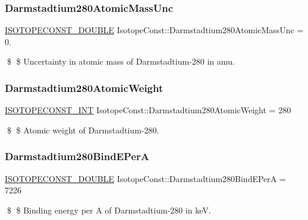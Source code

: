 \subsubsection{\texorpdfstring{Darmstadtium280\+Atomic\+Mass\+Unc}{Darmstadtium280AtomicMassUnc}}
{\footnotesize\ttfamily \mbox{\hyperlink{group___isotope_const-_macros_ga8f45a7272ce02c0b4c65c44636ed719a}{I\+S\+O\+T\+O\+P\+E\+C\+O\+N\+S\+T\+\_\+\+D\+O\+U\+B\+LE}} Isotope\+Const\+::\+Darmstadtium280\+Atomic\+Mass\+Unc = 0.}

\$ \$ Uncertainty in atomic mass of Darmstadtium-\/280 in amu. \mbox{\label{group___isotope_const-_darmstadtium-_ds280_ga6f14062b07b43977050a2e5d0925e7a1}} 
\subsubsection{\texorpdfstring{Darmstadtium280\+Atomic\+Weight}{Darmstadtium280AtomicWeight}}
{\footnotesize\ttfamily \mbox{\hyperlink{group___isotope_const-_macros_ga5f18360b3e99483a35c32d789e62621c}{I\+S\+O\+T\+O\+P\+E\+C\+O\+N\+S\+T\+\_\+\+I\+NT}} Isotope\+Const\+::\+Darmstadtium280\+Atomic\+Weight = 280}

\$ \$ Atomic weight of Darmstadtium-\/280. \mbox{\label{group___isotope_const-_darmstadtium-_ds280_ga363094922e09783d7a60f2b14e49276d}} 
\subsubsection{\texorpdfstring{Darmstadtium280\+Bind\+E\+PerA}{Darmstadtium280BindEPerA}}
{\footnotesize\ttfamily \mbox{\hyperlink{group___isotope_const-_macros_ga8f45a7272ce02c0b4c65c44636ed719a}{I\+S\+O\+T\+O\+P\+E\+C\+O\+N\+S\+T\+\_\+\+D\+O\+U\+B\+LE}} Isotope\+Const\+::\+Darmstadtium280\+Bind\+E\+PerA = 7226}

\$ \$ Binding energy per A of Darmstadtium-\/280 in keV. \mbox{\label{group___isotope_const-_darmstadtium-_ds280_ga1c0b60597afae947e1ed4971a671e9d1}} 
